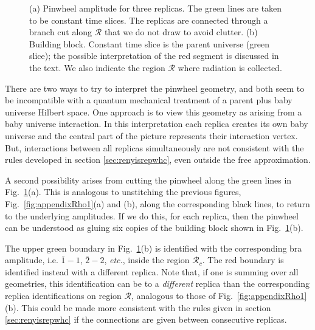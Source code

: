 \documentclass[11pt]{article}
\numberwithin{equation}{section}
\begin{document}
\begin{figure}[h!]
\begin{center}
 \caption{\label{fig:pinwheel} (a) Pinwheel amplitude for three replicas. The green lines are taken to be constant time slices. The replicas are connected through a branch cut along $\mathcal{R}$ that we do not draw to avoid clutter. (b) Building block. Constant time slice is the parent universe (green slice); the possible interpretation of the red segment is discussed in the text. We also indicate the region $\mathcal{R}$ where radiation is collected.}
\end{center}
\end{figure}

There are two ways to try to interpret the pinwheel geometry, and both seem to be incompatible with a quantum mechanical treatment of a parent plus baby universe Hilbert space. One approach is to view this geometry as arising from a baby universe interaction. In this interpretation each replica creates its own baby universe and the central part of the picture represents their interaction vertex. But, interactions between all replicas simultaneously are not consistent with the rules developed in section \ref{sec:renyisrepwhc}, even outside the free approximation.  

A second possibility arises from cutting the pinwheel along the green lines in Fig.~\ref{fig:pinwheel}(a).  This is analogous to unstitching the previous figures, Fig.~\ref{fig:appendixRho1}(a) and (b), along the corresponding black lines, to return to the underlying amplitudes.  If we do this, for each replica, 
then the pinwheel can be understood as gluing six copies of the building block shown in Fig.~\ref{fig:pinwheel}(b).

The upper green boundary in Fig.~\ref{fig:pinwheel}(b) is identified with the corresponding bra amplitude, i.e. $\bar{1}-1$, $\bar{2}-2$, {\it etc.}, inside the region $\mathcal{R}_c$. The red boundary is identified instead with a different replica. Note that, if one is summing over all geometries, this identification can be to a {\it different} replica than the corresponding replica identifications on region $\mathcal{R}$, analogous to those of Fig.~\ref{fig:appendixRho1}(b).  This could be made more consistent with the rules given in section \ref{sec:renyisrepwhc} if the connections are given between consecutive replicas. 
\end{document}

